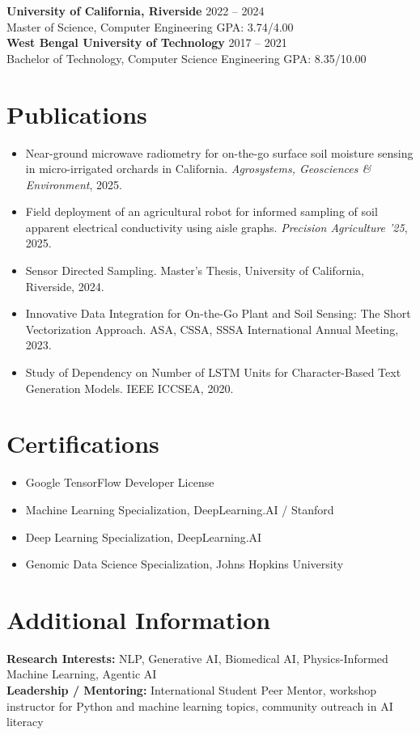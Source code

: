 \documentclass[10pt,letterpaper]{article}
\newcommand{\resumeSubheading}[4]{
    \textbf{#1} \hfill #2 \\
    #3 \hfill #4 \\
}
\newcommand{\resumeItem}[1]{
    \item #1
}
\begin{document}
\resumeSubheading
{University of California, Riverside}{2022 -- 2024}
{Master of Science, Computer Engineering}{GPA: 3.74/4.00}

\resumeSubheading
{West Bengal University of Technology}{2017 -- 2021}
{Bachelor of Technology, Computer Science Engineering}{GPA: 8.35/10.00}

\section*{Publications}
\begin{itemize}[leftmargin=*, itemsep=2pt, topsep=2pt]
    \resumeItem{Near-ground microwave radiometry for on-the-go surface soil moisture sensing in micro-irrigated orchards in California. \textit{Agrosystems, Geosciences \& Environment}, 2025.}
    \resumeItem{Field deployment of an agricultural robot for informed sampling of soil apparent electrical conductivity using aisle graphs. \textit{Precision Agriculture '25}, 2025.}
    \resumeItem{Sensor Directed Sampling. Master's Thesis, University of California, Riverside, 2024.}
    \resumeItem{Innovative Data Integration for On-the-Go Plant and Soil Sensing: The Short Vectorization Approach. ASA, CSSA, SSSA International Annual Meeting, 2023.}
    \resumeItem{Study of Dependency on Number of LSTM Units for Character-Based Text Generation Models. IEEE ICCSEA, 2020.}
\end{itemize}

\section*{Certifications}
\begin{itemize}[leftmargin=*, itemsep=2pt, topsep=2pt]
    \resumeItem{Google TensorFlow Developer License}
    \resumeItem{Machine Learning Specialization, DeepLearning.AI / Stanford}
    \resumeItem{Deep Learning Specialization, DeepLearning.AI}
    \resumeItem{Genomic Data Science Specialization, Johns Hopkins University}
\end{itemize}

\section*{Additional Information}
\textbf{Research Interests:} NLP, Generative AI, Biomedical AI, Physics-Informed Machine Learning, Agentic AI \\
\textbf{Leadership / Mentoring:} International Student Peer Mentor, workshop instructor for Python and machine learning topics, community outreach in AI literacy
\end{document}
